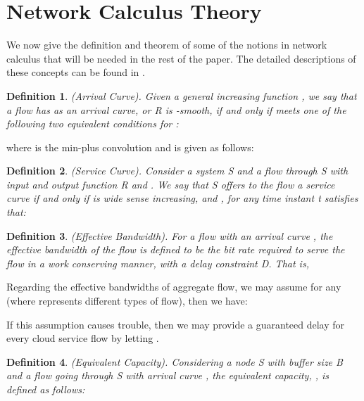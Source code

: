 \documentclass[a4paper]{article}
\newtheorem{definition}{Definition}
\begin{document}
\section{Network Calculus Theory}

We now give the definition and theorem of some of the notions in network calculus that will be needed in the rest of the paper. The detailed descriptions of these concepts can be found in \cite{le2001}.

\begin{definition}
(Arrival Curve). Given a general increasing function , we say that a flow  has  as an arrival curve, or R is -smooth, if and only if  meets one of the following two equivalent conditions for :



\end{definition}

\noindent where  is the min-plus convolution and is given as follows:



\begin{definition}
(Service Curve). Consider a system S and a flow through S with input and output function R and . We say that S offers to the flow a service curve  if and only if  is wide sense increasing, and , for any time instant t satisfies that:



\end{definition}

\begin{definition}
(Effective Bandwidth). For a flow with an arrival curve , the effective bandwidth  of the flow is defined to be the bit rate required to serve the flow in a work conserving manner, with a delay constraint D. That is,


\end{definition}

Regarding the effective bandwidths of aggregate flow, we may assume  for any  (where  represents different types of flow), then we have:



If this assumption causes trouble, then we may provide a guaranteed delay for every cloud service flow by letting .

\begin{definition}
(Equivalent Capacity). Considering a node S with buffer size B and a flow going through S with arrival curve , the equivalent capacity, , is defined as follows:


\end{definition}
\end{document}

